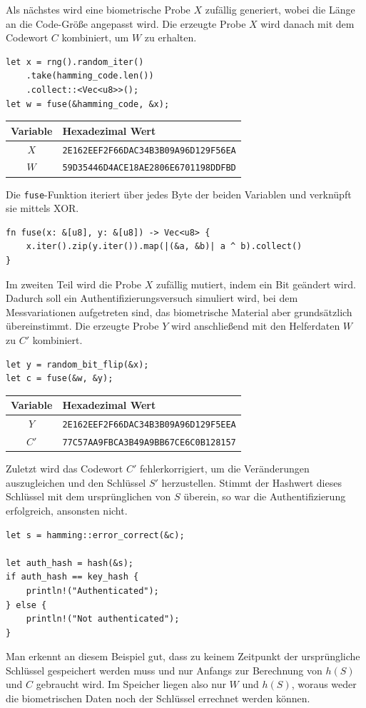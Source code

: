 \documentclass{article}
\begin{document}
    Als nächstes wird eine biometrische Probe $X$ zufällig generiert, wobei die Länge an die Code-Größe angepasst wird.
    Die erzeugte Probe $X$ wird danach mit dem Codewort $C$ kombiniert, um $W$ zu erhalten. 
    \begin{verbatim}
let x = rng().random_iter()
    .take(hamming_code.len())
    .collect::<Vec<u8>>();
let w = fuse(&hamming_code, &x);
    \end{verbatim}
    \begin{center}
        \begin{tabular}{cl}
            Variable & Hexadezimal Wert\\\hline
            $X$ & \verb|2E162EEF2F66DAC34B3B09A96D129F56EA|\\
            $W$ & \verb|59D35446D4ACE18AE2806E6701198DDFBD|
        \end{tabular}
    \end{center}
    Die \verb|fuse|-Funktion iteriert über jedes Byte der beiden Variablen und verknüpft sie mittels XOR.
    \begin{verbatim}
fn fuse(x: &[u8], y: &[u8]) -> Vec<u8> {
    x.iter().zip(y.iter()).map(|(&a, &b)| a ^ b).collect()
}
    \end{verbatim}
    Im zweiten Teil wird die Probe $X$ zufällig mutiert, indem ein Bit geändert wird. Dadurch soll ein 
    Authentifizierungsversuch simuliert wird, bei dem Messvariationen aufgetreten sind, das biometrische Material
    aber grundsätzlich übereinstimmt. Die erzeugte Probe $Y$ wird anschließend mit den Helferdaten $W$ zu $C'$ kombiniert.
    \begin{verbatim}
let y = random_bit_flip(&x);
let c = fuse(&w, &y);
    \end{verbatim}
    \begin{center}
        \begin{tabular}{cl}
            Variable & Hexadezimal Wert\\\hline
            $Y$ & \verb|2E162EEF2F66DAC34B3B09A96D129F5EEA|\\
            $C'$ & \verb|77C57AA9FBCA3B49A9BB67CE6C0B128157|
        \end{tabular}
    \end{center}
    Zuletzt wird das Codewort $C'$ fehlerkorrigiert, um die Veränderungen auszugleichen und den Schlüssel $S'$ 
    herzustellen. Stimmt der Hashwert dieses Schlüssel mit dem ursprünglichen von $S$ überein, so war die 
    Authentifizierung erfolgreich, ansonsten nicht.
    \begin{verbatim}
let s = hamming::error_correct(&c);

let auth_hash = hash(&s);
if auth_hash == key_hash {
    println!("Authenticated");
} else {
    println!("Not authenticated");
}
    \end{verbatim}
    Man erkennt an diesem Beispiel gut, dass zu keinem Zeitpunkt der ursprüngliche Schlüssel gespeichert werden muss und nur 
    Anfangs zur Berechnung von $h(S)$ und $C$ gebraucht wird. Im Speicher liegen also nur $W$ und $h(S)$, woraus weder
    die biometrischen Daten noch der Schlüssel errechnet werden können.
    \newpage
    
    
\end{document}
